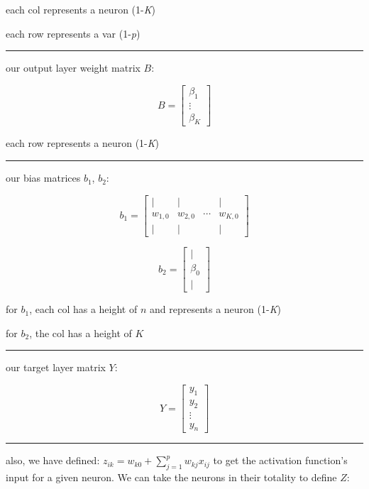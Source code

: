 \documentclass[
]{book}
\begin{document}
each col represents a neuron (1-\emph{K})

each row represents a var (1-\emph{p})

\begin{center}\rule{0.5\linewidth}{0.5pt}\end{center}

our output layer weight matrix \(B\):

\[
B =
\begin{bmatrix}
\beta_{1} \\
\vdots \\
\beta_{K}
\end{bmatrix}
\]

each row represents a neuron (1-\emph{K})

\begin{center}\rule{0.5\linewidth}{0.5pt}\end{center}

our bias matrices \(b_1\), \(b_2\):

\[
b_1 =
\begin{bmatrix}
| & | &  & | \\
w_{1, 0} & w_{2, 0} & \cdots & w_{K, 0} \\
| & | &  & |
\end{bmatrix}
\]

\[
b_2 = \begin{bmatrix} | \\ \beta_0 \\ | \end{bmatrix}
\]

for \(b_1\), each col has a height of \(n\) and represents a neuron (1-\emph{K})

for \(b_2\), the col has a height of \(K\)

\begin{center}\rule{0.5\linewidth}{0.5pt}\end{center}

our target layer matrix \(Y\):

\[
Y =
\begin{bmatrix}
y_1 \\
y_2 \\
\vdots \\
y_n
\end{bmatrix}
\]

\begin{center}\rule{0.5\linewidth}{0.5pt}\end{center}

also, we have defined: \(z_{ik} = w_{k0} + \sum_{j = 1}^p w_{kj} x_{ij}\) to get the activation function's input for a given neuron. We can take the neurons in their totality to define \(Z\):
\end{document}
